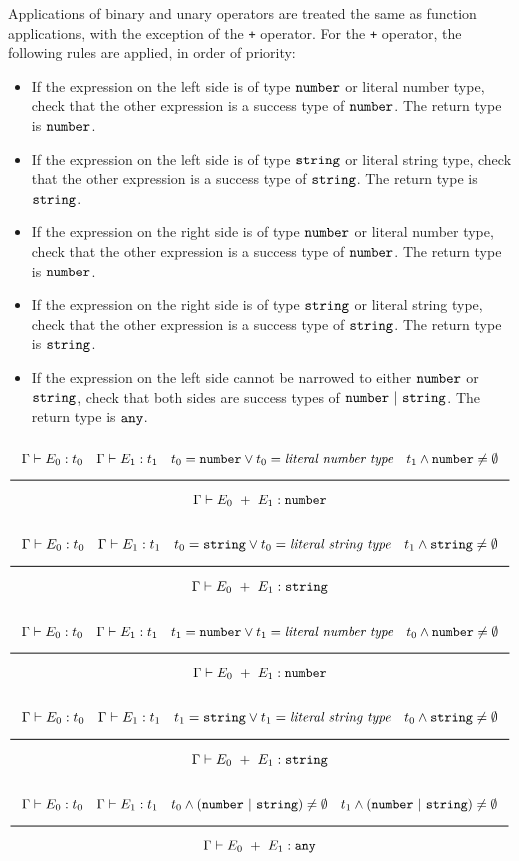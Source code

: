 Applications of binary and unary operators are treated the same as function applications, with the exception of the \texttt{+} operator.
For the \texttt{+} operator, the following rules are applied, in order of priority:

\begin{itemize}
\item{If the expression on the left side is of type $\texttt{number}$ or literal number type,
  check that the other expression is a success type of $\texttt{number}$. The return type is $\texttt{number}$.}
\item{If the expression on the left side is of type $\texttt{string}$ or literal string type,
  check that the other expression is a success type of $\texttt{string}$. The return type is $\texttt{string}$.}
\item{If the expression on the right side is of type $\texttt{number}$ or literal number type,
  check that the other expression is a success type of $\texttt{number}$. The return type is $\texttt{number}$.}
\item{If the expression on the right side is of type $\texttt{string}$ or literal string type,
  check that the other expression is a success type of $\texttt{string}$. The return type is $\texttt{string}$.}
\item{If the expression on the left side cannot be narrowed to either $\texttt{number}$ or $\texttt{string}$, check that both sides are success types of 
  $\texttt{number}\ |\ \texttt{string}$. The return type is $\texttt{any}$.}
\end{itemize}

\noindent
\[
  \Rule{\Gamma \vdash E_0 : t_0 \quad \Gamma \vdash E_1 : t_1 \quad t_0 = \Number \vee t_0 = \textit{literal number type}
    \quad t_1 \wedge \Number \neq \emptyset}{\Gamma \vdash E_0\ + \ E_1 : \Number}
\]
\noindent
\[
  \Rule{\Gamma \vdash E_0 : t_0 \quad \Gamma \vdash E_1 : t_1 \quad t_0 = \String \vee t_0 = \textit{literal string type}
    \quad t_1 \wedge \String \neq \emptyset}{\Gamma \vdash E_0\ + \ E_1 : \String}
\]
\noindent
\[
  \Rule{\Gamma \vdash E_0 : t_0 \quad \Gamma \vdash E_1 : t_1 \quad t_1 = \Number \vee t_1 = \textit{literal number type}
    \quad t_0 \wedge \Number \neq \emptyset}{\Gamma \vdash E_0\ + \ E_1 : \Number}
\]
\noindent
\[
  \Rule{\Gamma \vdash E_0 : t_0 \quad \Gamma \vdash E_1 : t_1 \quad t_1 = \String \vee t_1 = \textit{literal string type}
    \quad t_0 \wedge \String \neq \emptyset}{\Gamma \vdash E_0\ + \ E_1 : \String}
\]
\noindent
\[
  \Rule{\Gamma \vdash E_0 : t_0 \quad \Gamma \vdash E_1 : t_1 \quad t_0 \wedge (\Number\ |\ \String) \neq \emptyset
    \quad t_1 \wedge (\Number\ |\ \String) \neq \emptyset}{\Gamma \vdash E_0\ + \ E_1 : \Any}
\]
\noindent

